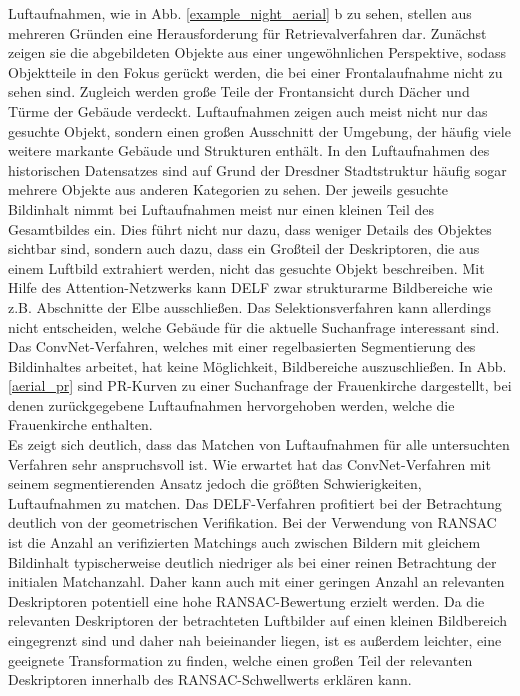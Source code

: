 Luftaufnahmen, wie in Abb. \ref{example_night_aerial} b zu sehen, stellen aus mehreren Gründen eine Herausforderung für Retrievalverfahren dar. Zunächst zeigen sie die abgebildeten Objekte aus einer ungewöhnlichen Perspektive, sodass Objektteile in den Fokus gerückt werden, die bei einer Frontalaufnahme nicht zu sehen sind. Zugleich werden große Teile der Frontansicht durch Dächer und Türme der Gebäude verdeckt. Luftaufnahmen zeigen auch meist nicht nur das gesuchte Objekt, sondern einen großen Ausschnitt der Umgebung, der häufig viele weitere markante Gebäude und Strukturen enthält. In den Luftaufnahmen des historischen Datensatzes sind auf Grund der Dresdner Stadtstruktur häufig sogar mehrere Objekte aus anderen Kategorien zu sehen. Der jeweils gesuchte Bildinhalt nimmt bei Luftaufnahmen meist nur einen kleinen Teil des Gesamtbildes ein. Dies führt nicht nur dazu, dass weniger Details des Objektes sichtbar sind, sondern auch dazu, dass ein Großteil der Deskriptoren, die aus einem Luftbild extrahiert werden, nicht das gesuchte Objekt beschreiben. Mit Hilfe des Attention-Netzwerks kann DELF zwar strukturarme Bildbereiche wie z.B. Abschnitte der Elbe ausschließen. Das Selektionsverfahren kann allerdings nicht entscheiden, welche Gebäude für die aktuelle Suchanfrage interessant sind. Das ConvNet-Verfahren, welches mit einer regelbasierten Segmentierung des Bildinhaltes arbeitet, hat keine Möglichkeit, Bildbereiche auszuschließen. In Abb. \ref{aerial_pr} sind PR-Kurven zu einer Suchanfrage der Frauenkirche dargestellt, bei denen zurückgegebene Luftaufnahmen hervorgehoben werden, welche die Frauenkirche enthalten.
\\
Es zeigt sich deutlich, dass das Matchen von Luftaufnahmen für alle untersuchten Verfahren sehr anspruchsvoll ist. Wie erwartet hat das ConvNet-Verfahren mit seinem segmentierenden Ansatz jedoch die größten Schwierigkeiten, Luftaufnahmen zu matchen. Das DELF-Verfahren profitiert bei der Betrachtung deutlich von der geometrischen Verifikation. Bei der Verwendung von RANSAC ist die Anzahl an verifizierten Matchings auch zwischen Bildern mit gleichem Bildinhalt typischerweise deutlich niedriger als bei einer reinen Betrachtung der initialen Matchanzahl. Daher kann auch mit einer geringen Anzahl an relevanten Deskriptoren potentiell eine hohe RANSAC-Bewertung erzielt werden. Da die relevanten Deskriptoren der betrachteten Luftbilder auf einen kleinen Bildbereich eingegrenzt sind und daher nah beieinander liegen, ist es außerdem leichter, eine geeignete Transformation zu finden, welche einen großen Teil der relevanten Deskriptoren innerhalb des RANSAC-Schwellwerts erklären kann. 
